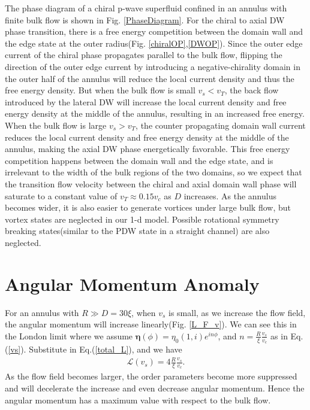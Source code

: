\documentclass[aps,prb,reprint,groupedaddress]{revtex4-2}
\begin{document}
The phase diagram of a chiral p-wave superfluid confined in an annulus with finite
bulk flow is shown in Fig. \ref{PhaseDiagram}. For the chiral to axial DW phase
transition, there is a free energy competition between the domain wall and the edge
state at the outer radius(Fig. \ref{chiralOP},\ref{DWOP}). Since the outer
edge current of the chiral phase propagates parallel to the bulk flow, flipping the
direction of the outer edge current by introducing a negative-chirality domain in
the outer half of the annulus will reduce the local current density and thus the free energy
density. But when the bulk flow is small $v_s<v_T$, the back flow introduced by the
lateral DW will increase the local current density and free energy density at the
middle of the annulus, resulting in an increased free energy. When the bulk
flow is large $v_s>v_T$, the counter propagating domain wall current reduces the
local current density and free energy density at the middle of the annulus, making
the axial DW phase energetically favorable. This free energy competition happens
between the domain wall and the edge state, and is irrelevant to the width of the
bulk regions of the two domains, so we expect that the transition flow velocity
between the chiral and axial domain wall phase will saturate to a constant value of
$v_T\approx0.15v_c$ as $D$ increases. As the annulus becomes wider, it is also
easier to generate vortices under large bulk flow, but vortex states are neglected
in our 1-d model. Possible rotational symmetry breaking states(similar to
the PDW state in a straight channel) are also neglected.

\section{Angular Momentum Anomaly}\label{sec:AngularMomentum}

For an annulus with $R\gg D=30\xi$, when $v_s$ is small, as we increase the flow field,
the angular momentum will increase linearly(Fig. \ref{L_F_v}). We can see this in
the London limit where we assume $\bm{\eta}(\phi)=\eta_0(1,i)e^{in\phi}$,
and $n=\frac{R}{\xi}\frac{v_s}{v_c}$ as in Eq.(\ref{vs}).
Substitute in Eq.(\ref{total_L}), and we have
\begin{align}
    \mathcal{L}(v_s) = 4 \frac{R}{\xi} \frac{v_s}{v_c}.
\end{align}
As the flow field becomes larger, the order parameters become more suppressed and will
decelerate the increase and even decrease angular momentum. Hence the angular momentum
has a maximum value with respect to the bulk flow.
\end{document}
